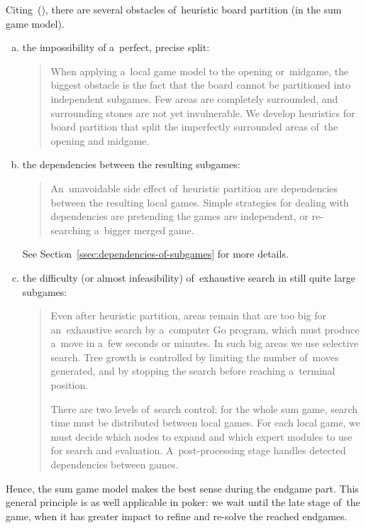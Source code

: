 Citing~(\cite{Muller1995computer}), there are several obstacles of~heuristic board partition (in the sum game model).

\begin{enumerate}[(a)]
  \item the impossibility of a~perfect, precise split:
    \begin{quotation} \noindent
      When applying a~local game model to the opening or~midgame, the biggest obstacle is the fact that the board cannot be partitioned into independent subgames.
      Few areas are completely surrounded, and surrounding stones are not yet invulnerable.
      We develop heuristics for board partition that split the imperfectly surrounded areas of~the opening and midgame.
    \end{quotation}

  \item the dependencies between the resulting subgames: 
    \begin{quotation} \noindent
      An~unavoidable side effect of~heuristic partition are dependencies between the resulting local games.
      Simple strategies for dealing with dependencies are pretending the games are independent, or re-searching a~bigger merged game.
    \end{quotation}
    See Section~\ref{ssec:dependencies-of-subgames} for more details.

  \item the difficulty (or almost infeasibility) of~exhaustive search in still quite large subgames:
    \begin{quotation} \noindent
      Even after heuristic partition, areas remain that are too big for an~exhaustive search by a~computer Go program, which must produce a~move in a~few seconds or minutes.
      In such big areas we use selective search.
      Tree growth is controlled by limiting the number of~moves generated, and by stopping the search before reaching a~terminal position.

      There are two levels of~search control:
      for the whole sum game, search time must be distributed between local games.
      For each local game, we must decide which nodes to expand and which expert modules to use for search and evaluation.
      A~post-processing stage handles detected dependencies between games.
    \end{quotation}
\end{enumerate}

Hence, the sum game model makes the best sense during the endgame part.
This general principle is as well applicable in poker:
we wait until the late stage of~the game, when it has greater impact to refine and re-solve the reached endgames.

